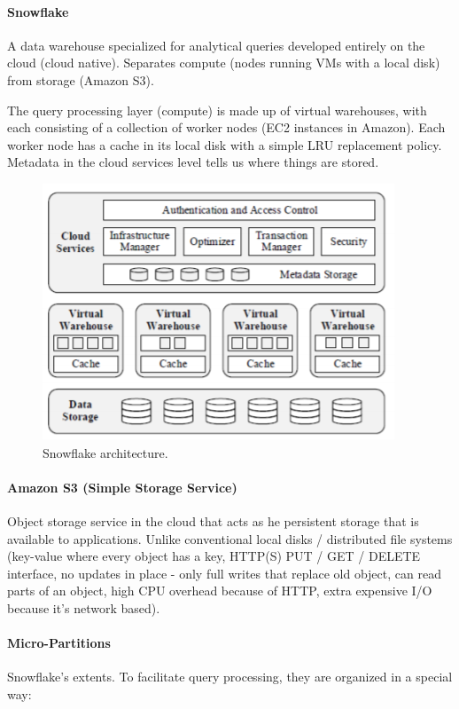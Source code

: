 \paragraph{Snowflake}
A data warehouse specialized for analytical queries developed entirely on the cloud (cloud native). Separates compute (nodes running VMs with a local disk) from storage (Amazon S3).

The query processing layer (compute) is made up of virtual warehouses, with each consisting of a collection of worker nodes (EC2 instances in Amazon). Each worker node has a cache in its local disk with a simple LRU replacement policy. Metadata in the cloud services level tells us where things are stored. %

\begin{figure}[h]
	\centering
	\includegraphics[scale=0.8]{images/1-snowflake.PNG}
	\caption{Snowflake architecture.}
	\label{fig:snowflake}
\end{figure}

\paragraph{Amazon S3 (Simple Storage Service)}
Object storage service in the cloud that acts as he persistent storage that is available to applications. Unlike conventional local disks / distributed file systems (key-value where every object has a key, HTTP(S) PUT / GET / DELETE interface, no updates in place - only full writes that replace old object, can read parts of an object, high CPU overhead because of HTTP, extra expensive I/O because it's network based).

\paragraph{Micro-Partitions}
Snowflake's extents. To facilitate query processing, they are organized in a special way:

